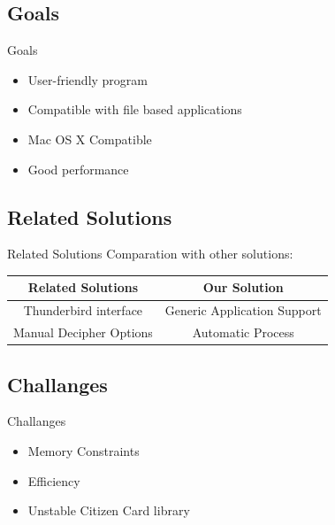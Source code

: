 \subsection{Goals}
\begin{frame}{Goals}
\begin{itemize}
\item User-friendly program
\item Compatible with file based applications
\item Mac OS X Compatible
\item Good performance
\end{itemize}
\end{frame}

\subsection{Related Solutions}
\begin{frame}{Related Solutions}
Comparation with other solutions:
 \begin{table}[htdp]
\begin{center}
\begin{tabular}{|c|c|} \hline
     \textbf{Related Solutions} & \textbf{Our Solution}  \\ \hline
     Thunderbird interface & Generic Application Support \\ \hline
     Manual Decipher Options & Automatic Process\\ \hline
\end{tabular}
\end{center}
\end{table}
\end{frame}



\subsection{Challanges}
\begin{frame}{Challanges}
\begin{itemize}
  \item Memory Constraints
  \item Efficiency
  \item Unstable Citizen Card library 
\end{itemize}
\end{frame}




